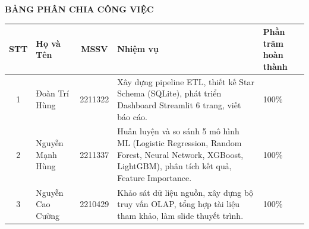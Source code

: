 \documentclass[12pt]{article}
\begin{document}


\thispagestyle{plain}
\begin{center}
  {\large\bfseries BẢNG PHÂN CHIA CÔNG VIỆC}
\end{center}

\begin{tabular}{|c|l|c|p{5.5cm}|p{2.5cm}|}
\hline
\textbf{STT} & \textbf{Họ và Tên} & \textbf{MSSV} & \textbf{Nhiệm vụ} & \textbf{Phần trăm hoàn thành} \\
\hline
1 & Đoàn Trí Hùng  & 2211322 &
  Xây dựng pipeline ETL, thiết kế Star Schema (SQLite),
  phát triển Dashboard Streamlit 6 trang,
  viết báo cáo.
  & 100\% \\
\hline
2 & Nguyễn Mạnh Hùng & 2211337 &
  Huấn luyện và so sánh 5 mô hình ML
  (Logistic Regression, Random Forest, Neural Network,
  XGBoost, LightGBM),
  phân tích kết quả, Feature Importance.
  & 100\% \\
\hline
3 & Nguyễn Cao Cường & 2210429 &
  Khảo sát dữ liệu nguồn,
  xây dựng bộ truy vấn OLAP,
  tổng hợp tài liệu tham khảo, làm slide thuyết trình.
  & 100\% \\
\hline
\end{tabular}

\pagebreak

\tableofcontents
\pagebreak
\listoftables
\pagebreak
\listoffigures
\pagebreak

\setcounter{page}{1}








\end{document}
